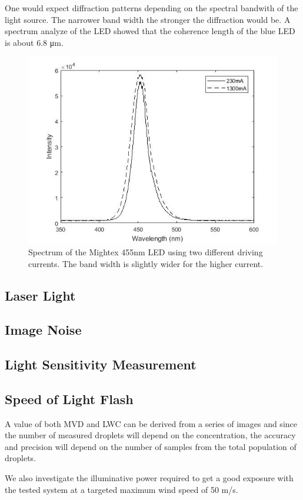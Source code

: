 One would expect diffraction patterns depending on the spectral bandwith of the light source. The narrower band width the stronger the diffraction would be. A spectrum analyze of the LED showed that the coherence length of the blue LED is about 6.8 μm.

\begin{figure}[ht]
\centering\includegraphics[width=0.6\linewidth]{figures/spektralanalys_mightex455nm}
\caption{Spectrum of the Mightex 455nm LED using two different driving currents. The band width is slightly wider for the higher current.}
\end{figure}

\subsection{Laser Light}

\subsection{Image Noise}

\subsection{Light Sensitivity Measurement}

\subsection{Speed of Light Flash}

A value of both MVD and LWC can be derived from a series of images and since the number of measured droplets will depend on the concentration, the accuracy and precision will depend on the number of samples from the total population of droplets. 


We also investigate the illuminative power required to get a good exposure with the tested system at a targeted maximum wind speed of 50 m/s.

